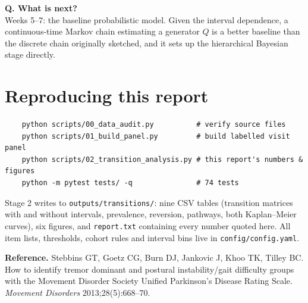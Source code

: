 \documentclass[11pt,a4paper]{article}
\newcommand{\code}[1]{\texttt{\small #1}}
\begin{document}
\medskip
\noindent\textbf{Q. What is next?}\\
Weeks 5--7: the baseline probabilistic model. Given the interval dependence, a
continuous-time Markov chain estimating a generator $Q$ is a better baseline
than the discrete chain originally sketched, and it sets up the hierarchical
Bayesian stage directly.

\section{Reproducing this report}

\begin{verbatim}
    python scripts/00_data_audit.py          # verify source files
    python scripts/01_build_panel.py         # build labelled visit panel
    python scripts/02_transition_analysis.py # this report's numbers & figures
    python -m pytest tests/ -q               # 74 tests
\end{verbatim}

\noindent
Stage 2 writes to \code{outputs/transitions/}: nine CSV tables (transition
matrices with and without intervals, prevalence, reversion, pathways, both
Kaplan--Meier curves), six figures, and \code{report.txt} containing every
number quoted here. All item lists, thresholds, cohort rules and interval bins
live in \code{config/config.yaml}.

\vspace{1em}
\noindent\textbf{Reference.} Stebbins GT, Goetz CG, Burn DJ, Jankovic J, Khoo TK,
Tilley BC. How to identify tremor dominant and postural instability/gait
difficulty groups with the Movement Disorder Society Unified Parkinson's Disease
Rating Scale. \emph{Movement Disorders} 2013;28(5):668--70.
\end{document}

